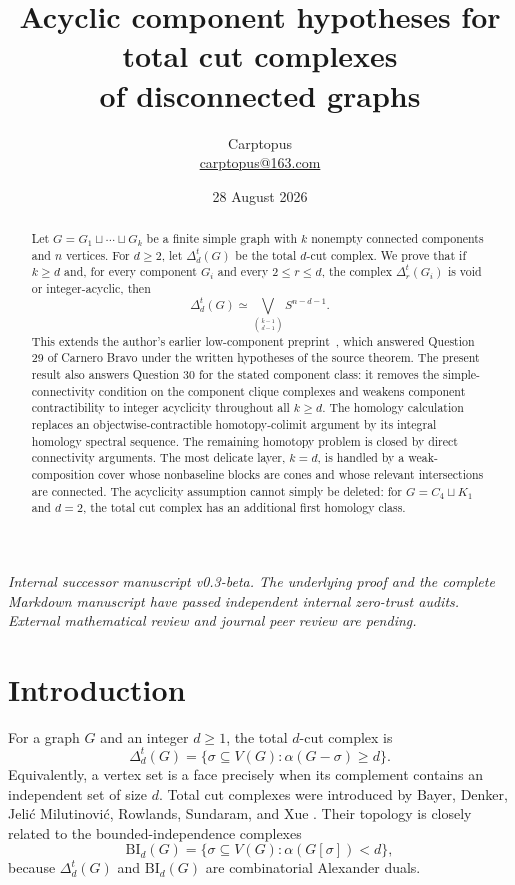 \documentclass[11pt]{article}
\title{Acyclic component hypotheses for total cut complexes\\of disconnected graphs}
\author{Carptopus\\\href{mailto:carptopus@163.com}{carptopus@163.com}}
\date{28 August 2026}
\theoremstyle{remark}
\numberwithin{equation}{section}
\begin{document}
\maketitle

\begin{center}
\small\itshape
Internal successor manuscript v0.3-beta. The underlying proof and the complete
Markdown manuscript have passed independent internal zero-trust audits.
External mathematical review and journal peer review are pending.
\end{center}
\vspace{0.8em}

\begin{abstract}
Let $G=G_1\sqcup\cdots\sqcup G_k$ be a finite simple graph with $k$ nonempty
connected components and $n$ vertices. For $d\geq2$, let $\Delta_d^t(G)$ be
the total $d$-cut complex. We prove that if $k\geq d$ and, for every component
$G_i$ and every $2\leq r\leq d$, the complex $\Delta_r^t(G_i)$ is void or
integer-acyclic, then
\[
\Delta_d^t(G)\simeq
\bigvee_{\binom{k-1}{d-1}}S^{n-d-1}.
\]
This extends the author's earlier low-component preprint~\cite{ref8}, which answered
Question 29 of Carnero Bravo under the written hypotheses of the source
theorem. The present result also answers Question 30 for the stated component
class: it removes the simple-connectivity condition on the component clique
complexes and weakens component contractibility to integer acyclicity
throughout all $k\geq d$. The homology calculation replaces an
objectwise-contractible homotopy-colimit argument by its integral homology
spectral sequence. The remaining homotopy problem is closed by direct
connectivity arguments. The most delicate layer, $k=d$, is handled by a
weak-composition cover whose nonbaseline blocks are cones and whose relevant
intersections are connected. The acyclicity assumption cannot simply be
deleted: for $G=C_4\sqcup K_1$ and $d=2$, the total cut complex has an
additional first homology class.
\end{abstract}

\section{Introduction}

For a graph $G$ and an integer $d\geq1$, the total $d$-cut complex is
\begin{equation}
\Delta_d^t(G)
=\{\sigma\subseteq V(G):\alpha(G-\sigma)\geq d\}.
\label{eq:total-cut}
\end{equation}
Equivalently, a vertex set is a face precisely when its complement contains
an independent set of size $d$. Total cut complexes were introduced by Bayer,
Denker, Jeli\'c Milutinovi\'c, Rowlands, Sundaram, and Xue \cite{ref1}. Their
topology is closely related to the bounded-independence complexes
\begin{equation}
\mathrm{BI}_d(G)
=\{\sigma\subseteq V(G):\alpha(G[\sigma])<d\},
\label{eq:bounded-independence}
\end{equation}
because $\Delta_d^t(G)$ and $\mathrm{BI}_d(G)$ are combinatorial Alexander
duals.
\end{document}
